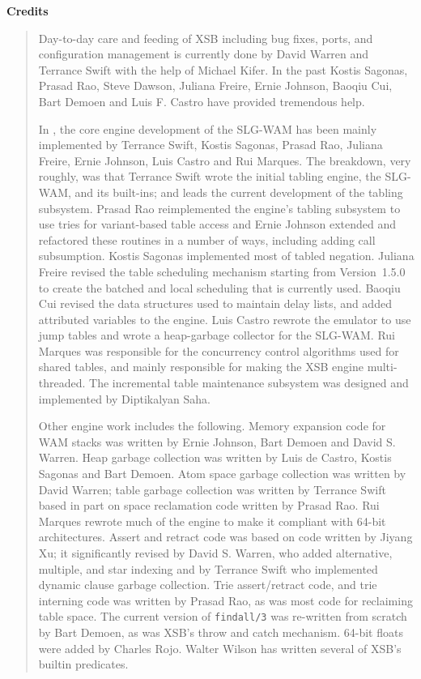 \begin{center}
{\bf {\Large 
		Credits
}}
\end{center}


\begin{quote}
Day-to-day care and feeding of XSB including bug fixes, ports, and
configuration management is currently done by David Warren and
Terrance Swift with the help of Michael Kifer.  In the past Kostis
Sagonas, Prasad Rao, Steve Dawson, Juliana Freire, Ernie Johnson,
Baoqiu Cui, Bart Demoen and Luis F.  Castro have provided tremendous
help.

In \version, the core engine development of the SLG-WAM has been
mainly implemented by Terrance Swift, Kostis Sagonas, Prasad Rao,
Juliana Freire, Ernie Johnson, Luis Castro and Rui Marques.  The
breakdown, very roughly, was that Terrance Swift wrote the initial
tabling engine, the SLG-WAM, and its built-ins; and leads the current
development of the tabling subsystem.  Prasad Rao reimplemented the
engine's tabling subsystem to use tries for variant-based table access
and Ernie Johnson extended and refactored these routines in a number
of ways, including adding call subsumption.  Kostis Sagonas
implemented most of tabled negation.  Juliana Freire revised the table
scheduling mechanism starting from Version~1.5.0 to create the batched
and local scheduling that is currently used.  Baoqiu Cui revised the
data structures used to maintain delay lists, and added attributed
variables to the engine.  Luis Castro rewrote the emulator to use jump
tables and wrote a heap-garbage collector for the SLG-WAM.  Rui
Marques was responsible for the concurrency control algorithms used
for shared tables, and mainly responsible for making the XSB engine
multi-threaded.  The incremental table maintenance subsystem was
designed and implemented by Diptikalyan Saha.

Other engine work includes the following.  Memory expansion code for
WAM stacks was written by Ernie Johnson, Bart Demoen and David
S. Warren.  Heap garbage collection was written by Luis de Castro,
Kostis Sagonas and Bart Demoen.  Atom space garbage collection was
written by David Warren; table garbage collection was written by
Terrance Swift based in part on space reclamation code written by
Prasad Rao.  Rui Marques rewrote much of the engine to make it
compliant with 64-bit architectures.  Assert and retract code was
based on code written by Jiyang Xu; it significantly revised by David
S. Warren, who added alternative, multiple, and star indexing and by
Terrance Swift who implemented dynamic clause garbage collection. Trie
assert/retract code, and trie interning code was written by Prasad
Rao, as was most code for reclaiming table space. The current version
of {\tt findall/3} was re-written from scratch by Bart Demoen, as was
XSB's throw and catch mechanism.  64-bit floats were added by Charles
Rojo.  Walter Wilson has written several of XSB's builtin predicates.


\end{quote}
